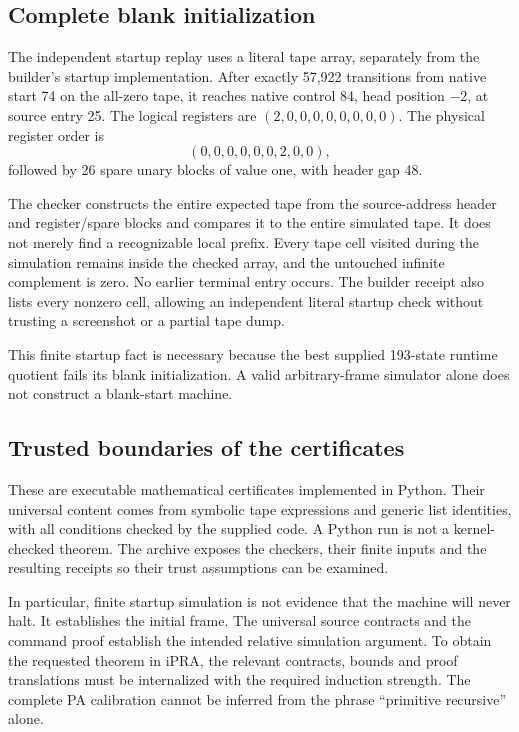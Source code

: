 \documentclass[11pt,a4paper]{article}
\begin{document}
\subsection{Complete blank initialization}

The independent startup replay uses a literal tape array, separately from
the builder's startup implementation. After exactly 57,922 transitions
from native start 74 on the all-zero tape, it reaches native control 84,
head position $-2$, at source entry 25. The logical registers are
$(2,0,0,0,0,0,0,0,0)$. The physical register order is
\[
 (0,0,0,0,0,0,2,0,0),
\]
followed by 26 spare unary blocks of value one, with header gap 48.

The checker constructs the entire expected tape from the source-address
header and register/spare blocks and compares it to the entire simulated
tape. It does not merely find a recognizable local prefix. Every tape
cell visited during the simulation remains inside the checked array,
and the untouched infinite complement is zero. No earlier terminal
entry occurs. The builder receipt also lists every nonzero cell, allowing
an independent literal startup check without trusting a screenshot or
a partial tape dump.

This finite startup fact is necessary because the best supplied 193-state
runtime quotient fails its blank initialization. A valid arbitrary-frame
simulator alone does not construct a blank-start machine.

\subsection{Trusted boundaries of the certificates}

These are executable mathematical certificates implemented in Python.
Their universal content comes from symbolic tape expressions and generic
list identities, with all conditions checked by the supplied code. A
Python run is not a kernel-checked theorem. The archive exposes the
checkers, their finite inputs and the resulting receipts so their trust
assumptions can be examined.

In particular, finite startup simulation is not evidence that the machine
will never halt. It establishes the initial frame. The universal source
contracts and the command proof establish the intended relative
simulation argument. To obtain the requested theorem in iPRA, the
relevant contracts, bounds and proof translations must be internalized
with the required induction strength. The complete PA calibration cannot
be inferred from the phrase ``primitive recursive'' alone.
\end{document}
